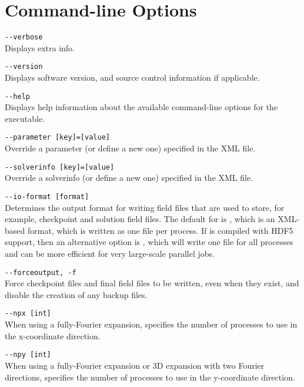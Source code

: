 \chapter{Command-line Options}

\lstinline[style=BashInputStyle]{--verbose}\\
\hangindent=1.5cm
Displays extra info.

\lstinline[style=BashInputStyle]{--version}\\
\hangindent=1.5cm
Displays software version, and source control information if applicable.

\lstinline[style=BashInputStyle]{--help}\\
\hangindent=1.5cm
Displays help information about the available command-line options for the executable.

\lstinline[style=BashInputStyle]{--parameter [key]=[value]}\\
\hangindent=1.5cm
Override a parameter (or define a new one) specified in the XML file.

\lstinline[style=BashInputStyle]{--solverinfo [key]=[value]}\\
\hangindent=1.5cm
Override a solverinfo (or define a new one) specified in the XML file.

\lstinline[style=BashInputStyle]{--io-format [format]}\\
\hangindent=1.5cm Determines the output format for writing \nekpp field files
that are used to store, for example, checkpoint and solution field files. The
default for  is , which is an XML-based format, which
is written as one file per process. If \nekpp is compiled with HDF5 support,
then an alternative option is , which will write one file for all
processes and can be more efficient for very large-scale parallel jobs.

\lstinline[style=BashInputStyle]{--forceoutput, -f}\\
\hangindent=1.5cm
Force checkpoint files and final field files to be written, even when they exist, and disable the creation of any backup files.

\lstinline[style=BashInputStyle]{--npx [int]}\\
\hangindent=1.5cm
When using a fully-Fourier expansion, specifies the number of processes to use in the x-coordinate direction.

\lstinline[style=BashInputStyle]{--npy [int]}\\
\hangindent=1.5cm
\quad When using a fully-Fourier expansion or 3D expansion with two Fourier directions, specifies the number of processes to use in the y-coordinate direction.

